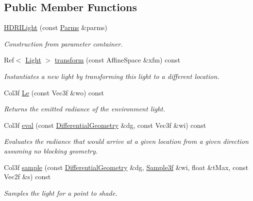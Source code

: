\subsection*{Public Member Functions}
\begin{DoxyCompactItemize}
\item 
\hyperlink{classembree_1_1_h_d_r_i_light_a7107a2127da8ead737c5c50a15faae87}{HDRILight} (const \hyperlink{classembree_1_1_parms}{Parms} \&parms)
\begin{DoxyCompactList}\small\item\em Construction from parameter container. \item\end{DoxyCompactList}\item 
Ref$<$ \hyperlink{classembree_1_1_light}{Light} $>$ \hyperlink{classembree_1_1_h_d_r_i_light_af116d30023fec29a9e0bc046151f604b}{transform} (const AffineSpace \&xfm) const 
\begin{DoxyCompactList}\small\item\em Instantiates a new light by transforming this light to a different location. \item\end{DoxyCompactList}\item 
Col3f \hyperlink{classembree_1_1_h_d_r_i_light_ae2b1f108f969a62ce73e1404705ecb45}{Le} (const Vec3f \&wo) const 
\begin{DoxyCompactList}\small\item\em Returns the emitted radiance of the environment light. \item\end{DoxyCompactList}\item 
Col3f \hyperlink{classembree_1_1_h_d_r_i_light_ab9bf74a2d856a458b9c19b9d6d09b3ac}{eval} (const \hyperlink{structembree_1_1_differential_geometry}{DifferentialGeometry} \&dg, const Vec3f \&wi) const 
\begin{DoxyCompactList}\small\item\em Evaluates the radiance that would arrive at a given location from a given direction assuming no blocking geometry. \item\end{DoxyCompactList}\item 
Col3f \hyperlink{classembree_1_1_h_d_r_i_light_a12fc5f0adebf246c6323be76800a7804}{sample} (const \hyperlink{structembree_1_1_differential_geometry}{DifferentialGeometry} \&dg, \hyperlink{structembree_1_1_sample}{Sample3f} \&wi, float \&tMax, const Vec2f \&s) const 
\begin{DoxyCompactList}\small\item\em Samples the light for a point to shade. \item\end{DoxyCompactList}\item 

\end{DoxyCompactItemize}
